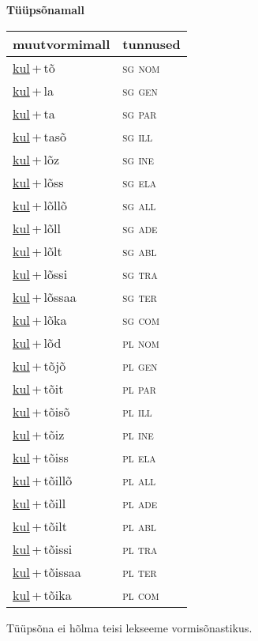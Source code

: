 
\vspace{1.8em}
\begin{minipage}{\textwidth}
\textbf{Tüüpsõnamall \,}\\

\begin{sideways}
\begin{tabular}{l l}
muutvormimall & tunnused \\
\hline
\underline{kul}\,+\,tõ & \textsc{ sg nom } \\
\underline{kul}\,+\,la & \textsc{ sg gen } \\
\underline{kul}\,+\,ta & \textsc{ sg par } \\
\underline{kul}\,+\,tasõ & \textsc{ sg ill } \\
\underline{kul}\,+\,lõz & \textsc{ sg ine } \\
\underline{kul}\,+\,lõss & \textsc{ sg ela } \\
\underline{kul}\,+\,lõllõ & \textsc{ sg all } \\
\underline{kul}\,+\,lõll & \textsc{ sg ade } \\
\underline{kul}\,+\,lõlt & \textsc{ sg abl } \\
\underline{kul}\,+\,lõssi & \textsc{ sg tra } \\
\underline{kul}\,+\,lõssaa & \textsc{ sg ter } \\
\underline{kul}\,+\,lõka & \textsc{ sg com } \\
\underline{kul}\,+\,lõd & \textsc{ pl nom } \\
\underline{kul}\,+\,tõjõ & \textsc{ pl gen } \\
\underline{kul}\,+\,tõit & \textsc{ pl par } \\
\underline{kul}\,+\,tõisõ & \textsc{ pl ill } \\
\underline{kul}\,+\,tõiz & \textsc{ pl ine } \\
\underline{kul}\,+\,tõiss & \textsc{ pl ela } \\
\underline{kul}\,+\,tõillõ & \textsc{ pl all } \\
\underline{kul}\,+\,tõill & \textsc{ pl ade } \\
\underline{kul}\,+\,tõilt & \textsc{ pl abl } \\
\underline{kul}\,+\,tõissi & \textsc{ pl tra } \\
\underline{kul}\,+\,tõissaa & \textsc{ pl ter } \\
\underline{kul}\,+\,tõika & \textsc{ pl com } \\
\end{tabular}
\end{sideways}
\label{tab:tüüpsõnamall-kultõ}

\end{minipage}

 
\vspace{1em}
\noindent Tüüpsõna ei hõlma teisi lekseeme vormi\-sõnastikus.

